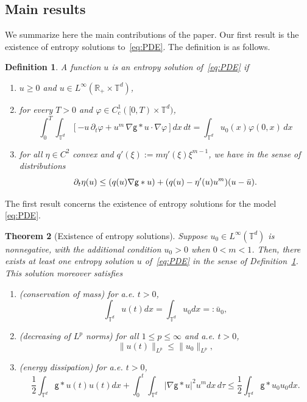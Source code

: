 \documentclass[11pt]{article}
\newtheorem{thm}{Theorem}[section]
\newtheorem{mydef}[thm]{Definition}
\numberwithin{equation}{section} %
\newcommand{\p}{{\partial}}
\newcommand{\R}{{\mathbb{R}}}
\newcommand{\T}{{\mathbb{T}}}
\newcommand{\g}{{\mathsf{g}}}
\let\div\relax
\DeclareMathOperator{\div}{\mathsf{div}}
\def \hal{\frac{1}{2}}
\def\nab{\nabla}
\begin{document}
\subsection{Main results}

We summarize here the main contributions of the paper. Our first result is the existence of entropy solutions to~\eqref{eq:PDE}. The definition is as follows.

\begin{mydef}\label{def:weaksolution}
A function $u$ is an entropy solution of~\eqref{eq:PDE} if
\begin{enumerate}
    \item $u\ge 0$ and $u\in L^{\infty}(\R_{+}\times\T^d)$,
    \item for every $T>0$ and $\varphi \in C^{1}_c([0,T)\times\T^d)$,
   \begin{equation*}
        \int_{0}^{T}\int_{\T^d}
        \left[-u\,\partial_t\varphi
              +u^m\,\nabla\g\ast u\cdot\nabla\varphi \right] dx\, dt
          =\int_{\T^d}u_0(x)\varphi(0,x)\,dx 
      \end{equation*}
      \item for all $\eta\in C^2$ convex and $q'(\xi) := m\eta'(\xi)\xi^{m-1}$, we have in the sense of distributions
      \begin{equation}\label{eq:entropycondition}
          \p_t \eta(u)\le \div(q(u)\nab\g\ast u) +(q(u)-\eta'(u) u^m)(u-\bar u).
      \end{equation}
\end{enumerate}
\end{mydef}

The first result concerns the existence of entropy solutions for the model \eqref{eq:PDE}.

\begin{thm}[Existence of entropy solutions]\label{thm:existence}
Suppose $u_{0}\in L^{\infty}(\T^d)$ is nonnegative, with the additional condition $u_{0}>0$ when $0<m<1$. Then, there exists at least one entropy solution $u$ of~\eqref{eq:PDE} in the sense of Definition~\ref{def:weaksolution}. This solution moreover satisfies
\begin{enumerate}
    \item (conservation of mass) for a.e. $t>0$,
    \begin{equation*}
        \int_{\T^d} u(t) dx = \int_{\T^d} u_0dx =: \bar u_0,
    \end{equation*}
    \item (decreasing of $L^p$ norms) for all $1\le p\le \infty$ and a.e. $t>0$, 
    \begin{equation*}
        \|u(t)\|_{L^p}\le \|u_0\|_{L^p}, 
    \end{equation*}
    \item (energy dissipation) for a.e. $t>0$,
    \begin{equation*}
        \hal\int_{\T^d}\g\ast u(t) u(t) dx + \int_{0}^t\int_{\T^d} |\nab\g\ast u|^2 u^m dx\, d\tau \le \hal \int_{\T^d}\g\ast u_0 u_0dx.
    \end{equation*}
\end{enumerate}
\end{thm}
\end{document}
